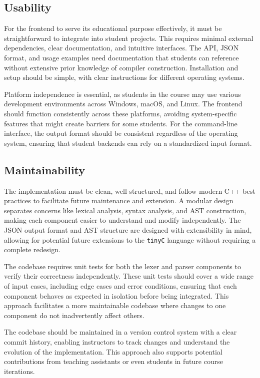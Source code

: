 \subsection{Usability}
For the frontend to serve its educational purpose effectively, it must be straightforward to integrate into student projects. This requires minimal external dependencies, clear documentation, and intuitive interfaces. The API, JSON format, and usage examples need documentation that students can reference without extensive prior knowledge of compiler construction. Installation and setup should be simple, with clear instructions for different operating systems.

Platform independence is essential, as students in the course may use various development environments across Windows, macOS, and Linux. The frontend should function consistently across these platforms, avoiding system-specific features that might create barriers for some students. For the command-line interface, the output format should be consistent regardless of the operating system, ensuring that student backends can rely on a standardized input format.


\subsection{Maintainability}
The implementation must be clean, well-structured, and follow modern C++ best practices to facilitate future maintenance and extension. A modular design separates concerns like lexical analysis, syntax analysis, and AST construction, making each component easier to understand and modify independently. The JSON output format and AST structure are designed with extensibility in mind, allowing for potential future extensions to the \texttt{tinyC} language without requiring a complete redesign.

The codebase requires unit tests for both the lexer and parser components to verify their correctness independently. These unit tests should cover a wide range of input cases, including edge cases and error conditions, ensuring that each component behaves as expected in isolation before being integrated. This approach facilitates a more maintainable codebase where changes to one component do not inadvertently affect others.

The codebase should be maintained in a version control system with a clear commit history, enabling instructors to track changes and understand the evolution of the implementation. This approach also supports potential contributions from teaching assistants or even students in future course iterations.


